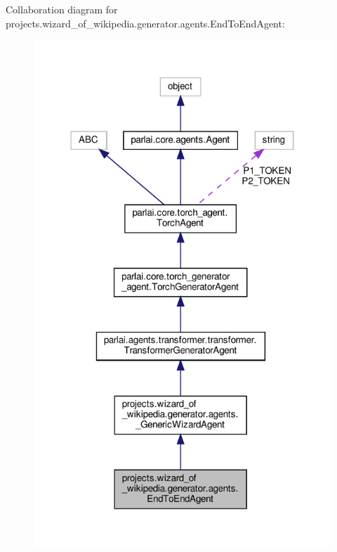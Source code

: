 Collaboration diagram for projects.\+wizard\+\_\+of\+\_\+wikipedia.\+generator.\+agents.\+End\+To\+End\+Agent\+:
\nopagebreak
\begin{figure}[H]
\begin{center}
\leavevmode
\includegraphics[width=318pt]{classprojects_1_1wizard__of__wikipedia_1_1generator_1_1agents_1_1EndToEndAgent__coll__graph}
\end{center}
\end{figure}
